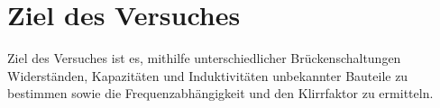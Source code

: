 \section{Ziel des Versuches}
\label{sec:versuchsziel}

Ziel des Versuches ist es, mithilfe unterschiedlicher Brückenschaltungen Widerständen, Kapazitäten und Induktivitäten unbekannter Bauteile zu bestimmen sowie die Frequenzabhängigkeit und den Klirrfaktor zu ermitteln.